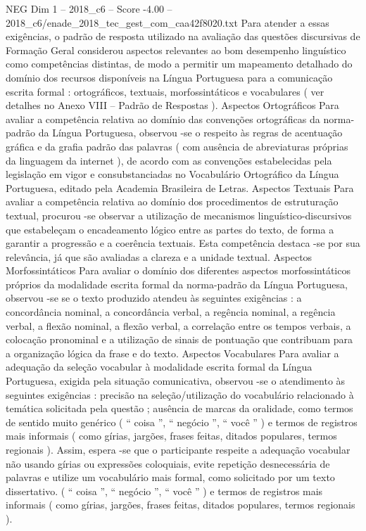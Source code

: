 \begin{textsample}{NEG Dim 1 – 2018\_c6 – Score -4.00 – 2018\_c6/enade\_2018\_tec\_gest\_com\_caa42f8020.txt}
Para atender a essas exigências, o padrão de resposta utilizado na avaliação das questões discursivas de Formação Geral considerou aspectos relevantes ao bom desempenho linguístico como competências distintas, de modo a permitir um mapeamento detalhado do domínio dos recursos disponíveis na Língua Portuguesa para a comunicação escrita formal : ortográficos, textuais, morfossintáticos e vocabulares ( ver detalhes no Anexo VIII – Padrão de Respostas ).
Aspectos Ortográficos Para avaliar a competência relativa ao domínio das convenções ortográficas da norma-padrão da Língua Portuguesa, observou -se o respeito às regras de acentuação gráfica e da grafia padrão das palavras ( com ausência de abreviaturas próprias da linguagem da internet ), de acordo com as convenções estabelecidas pela legislação em vigor e consubstanciadas no Vocabulário Ortográfico da Língua Portuguesa, editado pela Academia Brasileira de Letras.
Aspectos Textuais Para avaliar a competência relativa ao domínio dos procedimentos de estruturação textual, procurou -se observar a utilização de mecanismos linguístico-discursivos que estabeleçam o encadeamento lógico entre as partes do texto, de forma a garantir a progressão e a coerência textuais.
Esta competência destaca -se por sua relevância, já que são avaliadas a clareza e a unidade textual.
Aspectos Morfossintáticos Para avaliar o domínio dos diferentes aspectos morfossintáticos próprios da modalidade escrita formal da norma-padrão da Língua Portuguesa, observou -se se o texto produzido atendeu às seguintes exigências : a concordância nominal, a concordância verbal, a regência nominal, a regência verbal, a flexão nominal, a flexão verbal, a correlação entre os tempos verbais, a colocação pronominal e a utilização de sinais de pontuação que contribuam para a organização lógica da frase e do texto.
Aspectos Vocabulares Para avaliar a adequação da seleção vocabular à modalidade escrita formal da Língua Portuguesa, exigida pela situação comunicativa, observou -se o atendimento às seguintes exigências : precisão na seleção/utilização do vocabulário relacionado à temática solicitada pela questão ; ausência de marcas da oralidade, como termos de sentido muito genérico ( “ coisa ”, “ negócio ”, “ você ” ) e termos de registros mais informais ( como gírias, jargões, frases feitas, ditados populares, termos regionais ).
Assim, espera -se que o participante respeite a adequação vocabular não usando gírias ou expressões coloquiais, evite repetição desnecessária de palavras e utilize um vocabulário mais formal, como solicitado por um texto dissertativo. ( “ coisa ”, “ negócio ”, “ você ” ) e termos de registros mais informais ( como gírias, jargões, frases feitas, ditados populares, termos regionais ).

\end{textsample}
